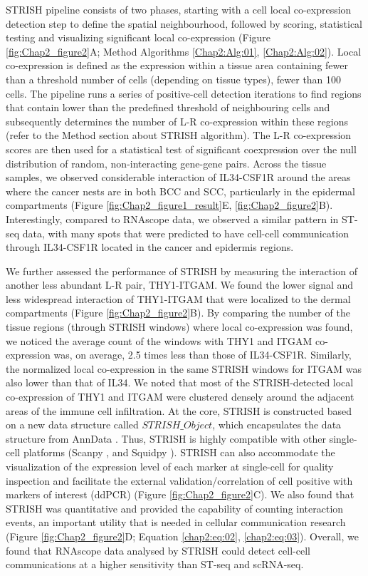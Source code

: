 STRISH pipeline consists of two phases, starting with a cell local co-expression detection step to define the spatial neighbourhood, followed by scoring, statistical testing and visualizing significant local co-expression (Figure \ref{fig:Chap2_figure2}A; Method Algorithms \ref{Chap2:Alg:01}, \ref{Chap2:Alg:02}). Local co-expression is defined as the expression within a tissue area containing fewer than a threshold number of cells (depending on tissue types), \ie fewer than 100 cells. The pipeline runs a series of positive-cell detection iterations to find regions that contain lower than the predefined threshold of neighbouring cells and subsequently determines the number of L-R co-expression within these regions (refer to the Method section about STRISH algorithm). The L-R co-expression scores are then used for a statistical test of significant coexpression over the null distribution of random, non-interacting gene-gene pairs. Across the tissue samples, we observed considerable interaction of IL34-CSF1R around the areas where the cancer nests are in both BCC and SCC, particularly in the epidermal compartments (Figure \ref{fig:Chap2_figure1_result}E, \ref{fig:Chap2_figure2}B). Interestingly, compared to RNAscope data, we observed a similar pattern in ST-seq data, with many spots that were predicted to have cell-cell communication through IL34-CSF1R located in the cancer and epidermis regions.  

We further assessed the performance of STRISH by measuring the interaction of another less abundant L-R pair, THY1-ITGAM. We found the lower signal and less widespread interaction of THY1-ITGAM that were localized to the dermal compartments (Figure \ref{fig:Chap2_figure2}B). By comparing the number of the tissue regions (through STRISH windows) where local co-expression was found, we noticed the average count of the windows with THY1 and ITGAM co-expression was, on average, 2.5 times less than those of IL34-CSF1R. Similarly, the normalized local co-expression in the same STRISH windows for ITGAM was also lower than that of IL34. We noted that most of the STRISH-detected local co-expression of THY1 and ITGAM were clustered densely around the adjacent areas of the immune cell infiltration. At the core, STRISH is constructed based on a new data structure called $STRISH\_Object$, which encapsulates the data structure from AnnData \cite{wolf2018scanpy}. Thus, STRISH is highly compatible with other single-cell platforms (\ie Scanpy \cite{wolf2018scanpy}, and Squidpy \cite{palla2022squidpy}). STRISH can also accommodate the visualization of the expression level of each marker at single-cell for quality inspection and facilitate the external validation/correlation of cell positive with markers of interest (\ie ddPCR) (Figure \ref{fig:Chap2_figure2}C). We also found that STRISH was quantitative and provided the capability of counting interaction events, an important utility that is needed in cellular communication research (Figure \ref{fig:Chap2_figure2}D; Equation \ref{chap2:eq:02}, \ref{chap2:eq:03}). Overall, we found that RNAscope data analysed by STRISH could detect cell-cell communications at a higher sensitivity than ST-seq and scRNA-seq. 

